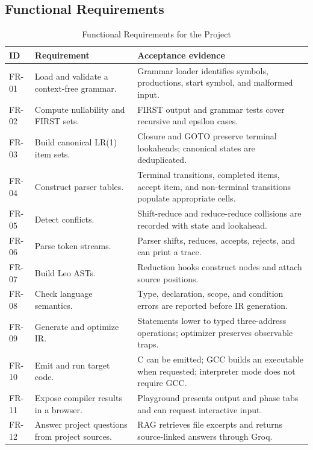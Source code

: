 \documentclass[12pt,a4paper,oneside]{report}
\begin{document}
\subsection{Functional Requirements}
\begin{longtable}{p{1.5cm}p{}p{}}
\caption{Functional Requirements for the Project}\\
\toprule
\textbf{ID} & \textbf{Requirement} & \textbf{Acceptance evidence}\\
\midrule
FR-01 & Load and validate a context-free grammar. & Grammar loader identifies symbols, productions, start symbol, and malformed input.\\
FR-02 & Compute nullability and FIRST sets. & FIRST output and grammar tests cover recursive and epsilon cases.\\
FR-03 & Build canonical LR(1) item sets. & Closure and GOTO preserve terminal lookaheads; canonical states are deduplicated.\\
FR-04 & Construct parser tables. & Terminal transitions, completed items, accept item, and non-terminal transitions populate appropriate cells.\\
FR-05 & Detect conflicts. & Shift-reduce and reduce-reduce collisions are recorded with state and lookahead.\\
FR-06 & Parse token streams. & Parser shifts, reduces, accepts, rejects, and can print a trace.\\
FR-07 & Build Leo ASTs. & Reduction hooks construct nodes and attach source positions.\\
FR-08 & Check language semantics. & Type, declaration, scope, and condition errors are reported before IR generation.\\
FR-09 & Generate and optimize IR. & Statements lower to typed three-address operations; optimizer preserves observable traps.\\
FR-10 & Emit and run target code. & C can be emitted; GCC builds an executable when requested; interpreter mode does not require GCC.\\
FR-11 & Expose compiler results in a browser. & Playground presents output and phase tabs and can request interactive input.\\
FR-12 & Answer project questions from project sources. & RAG retrieves file excerpts and returns source-linked answers through Groq.\\
\bottomrule
\end{longtable}
\end{document}
